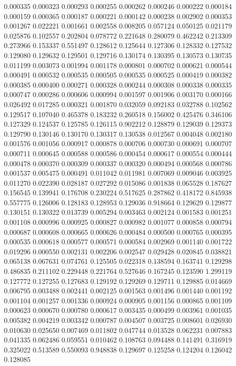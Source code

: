 0.000335
0.000323
0.000293
0.000255
0.000262
0.000246
0.000222
0.000184
0.000159
0.000365
0.000187
0.000221
0.000142
0.000238
0.002902
0.000353
0.001267
0.022221
0.001661
0.002558
0.008205
0.057124
0.050125
0.021179
0.025876
0.102557
0.202804
0.078772
0.221648
0.280079
0.462242
0.213309
0.273966
0.153337
0.551497
0.128612
0.125644
0.127306
0.128332
0.127532
0.129080
0.129632
0.129501
0.129716
0.130174
0.130395
0.130573
0.130735
0.011199
0.003073
0.001994
0.001178
0.000801
0.000702
0.000621
0.000544
0.000491
0.000532
0.000535
0.000505
0.000535
0.000525
0.000419
0.000382
0.000385
0.000400
0.000271
0.000328
0.000244
0.000308
0.000338
0.000335
0.000747
0.000286
0.000606
0.000994
0.001597
0.001906
0.003170
0.000166
0.026492
0.017285
0.000321
0.001870
0.032059
0.092183
0.032788
0.102562
0.129517
0.107040
0.465378
0.183232
0.260518
0.156002
0.425476
0.346106
0.127329
0.124537
0.125785
0.126115
0.902212
0.128879
0.129039
0.129373
0.129790
0.130146
0.130170
0.130317
0.130538
0.012567
0.004048
0.002180
0.001576
0.001056
0.000917
0.000878
0.000706
0.000730
0.000691
0.000707
0.000711
0.000645
0.000588
0.000586
0.000454
0.000617
0.000554
0.000444
0.000478
0.000370
0.000309
0.000337
0.000320
0.000494
0.000568
0.000786
0.001537
0.005475
0.000491
0.011042
0.011981
0.007069
0.009046
0.003925
0.011270
0.022390
0.028187
0.027292
0.015086
0.001838
0.065528
0.187627
0.156545
0.139941
0.176708
0.230224
0.517625
0.287862
0.418172
0.845938
0.557775
0.126006
0.128183
0.128953
0.129036
0.918664
0.129629
0.129877
0.130151
0.130322
0.013739
0.005294
0.003463
0.002124
0.001583
0.001251
0.001108
0.000996
0.000925
0.000827
0.000982
0.001077
0.000858
0.000794
0.000687
0.000608
0.000665
0.000626
0.000484
0.000500
0.000765
0.000395
0.000535
0.000618
0.000577
0.000571
0.000584
0.002969
0.001140
0.001722
0.019296
0.000550
0.002131
0.002206
0.002547
0.029428
0.020845
0.038821
0.065138
0.067631
0.074761
0.125505
0.022318
0.138594
0.163741
0.129298
0.486835
0.211102
0.229448
0.221764
0.527646
0.167245
0.123590
1.299119
0.127772
0.127255
0.127683
0.129192
0.129269
0.129711
0.129885
0.014669
0.006795
0.003488
0.002441
0.002125
0.001563
0.001496
0.001440
0.001192
0.001104
0.001257
0.001336
0.000924
0.000905
0.001156
0.000865
0.001109
0.000623
0.000670
0.000780
0.000617
0.003435
0.000499
0.003961
0.001035
0.005382
0.004219
0.003342
0.000787
0.004507
0.003725
0.008601
0.026930
0.010630
0.025650
0.007469
0.011802
0.047744
0.013528
0.062231
0.007883
0.041335
0.062486
0.059551
0.010462
0.108763
0.094488
0.141491
0.316919
0.325022
0.513589
0.550093
0.948838
0.129697
0.125258
0.124204
0.126042
0.128085
